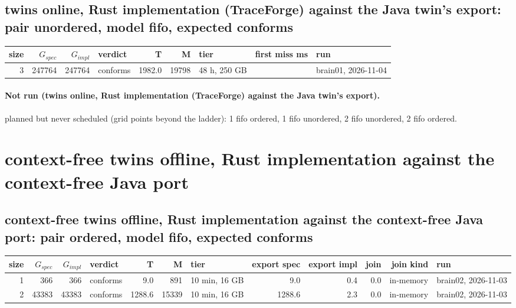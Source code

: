 \documentclass[10pt]{article}
\begin{document}
\subsection*{twins online, Rust implementation (TraceForge) against the Java twin's export: pair \textsf{unordered}, model fifo, expected conforms}
\begin{longtable}{@{}rrrlrrlrl@{}}
\toprule
size & $G_{\mathit{spec}}$ & $G_{\mathit{impl}}$ & verdict & T & M & tier & first miss ms & run \\
\midrule
\endhead
\color{blue} 3 & 247764 & 247764 & conforms & 1982.0 & 19798 & 48 h, 250 GB &  & brain01, 2026-11-04 \\
\bottomrule
\end{longtable}
\paragraph{Not run (twins online, Rust implementation (TraceForge) against the Java twin's export).}
planned but never scheduled (grid points beyond the ladder): 1 fifo ordered, 1 fifo unordered, 2 fifo unordered, 2 fifo ordered.\par
\section*{context-free twins offline, Rust implementation against the context-free Java port}
\subsection*{context-free twins offline, Rust implementation against the context-free Java port: pair \textsf{ordered}, model fifo, expected conforms}
\begin{longtable}{@{}rrrlrrlrrrrl@{}}
\toprule
size & $G_{\mathit{spec}}$ & $G_{\mathit{impl}}$ & verdict & T & M & tier & export spec & export impl & join & join kind & run \\
\midrule
\endhead
\color{red} 1 & 366 & 366 & conforms & 9.0 & 891 & 10 min, 16 GB & 9.0 & 0.4 & 0.0 & in-memory & brain02, 2026-11-03 \\
\color{red} 2 & 43383 & 43383 & conforms & 1288.6 & 15339 & 10 min, 16 GB & 1288.6 & 2.3 & 0.0 & in-memory & brain02, 2026-11-03 \\
\bottomrule
\end{longtable}
\end{document}
